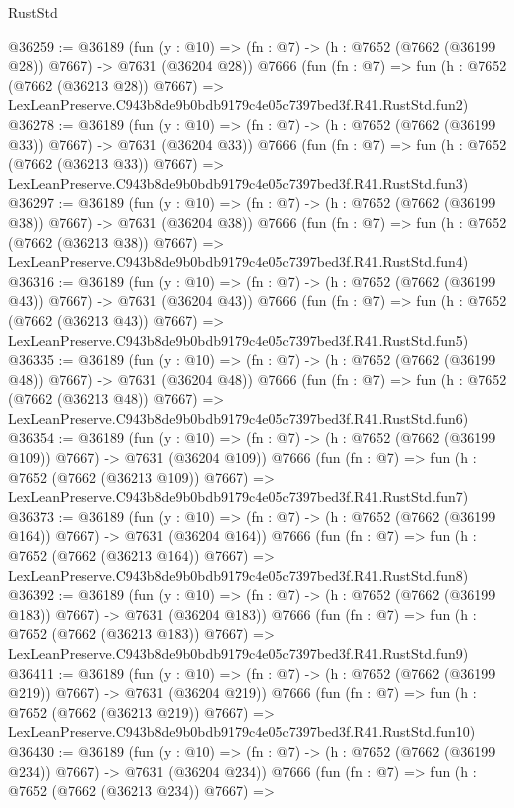 \begin{lexlean}{RustStd}
\begin{coremodule}
@36259 := @36189
    (fun (y : @10) => (fn : @7) -> (h : @7652 (@7662 (@36199 @28)) @7667) -> @7631 (@36204 @28))
    @7666
    (fun (fn : @7) =>
    fun (h : @7652 (@7662 (@36213 @28)) @7667) =>
    LexLeanPreserve.C943b8de9b0bdb9179c4e05c7397bed3f.R41.RustStd.fun2)
@36278 := @36189
    (fun (y : @10) => (fn : @7) -> (h : @7652 (@7662 (@36199 @33)) @7667) -> @7631 (@36204 @33))
    @7666
    (fun (fn : @7) =>
    fun (h : @7652 (@7662 (@36213 @33)) @7667) =>
    LexLeanPreserve.C943b8de9b0bdb9179c4e05c7397bed3f.R41.RustStd.fun3)
@36297 := @36189
    (fun (y : @10) => (fn : @7) -> (h : @7652 (@7662 (@36199 @38)) @7667) -> @7631 (@36204 @38))
    @7666
    (fun (fn : @7) =>
    fun (h : @7652 (@7662 (@36213 @38)) @7667) =>
    LexLeanPreserve.C943b8de9b0bdb9179c4e05c7397bed3f.R41.RustStd.fun4)
@36316 := @36189
    (fun (y : @10) => (fn : @7) -> (h : @7652 (@7662 (@36199 @43)) @7667) -> @7631 (@36204 @43))
    @7666
    (fun (fn : @7) =>
    fun (h : @7652 (@7662 (@36213 @43)) @7667) =>
    LexLeanPreserve.C943b8de9b0bdb9179c4e05c7397bed3f.R41.RustStd.fun5)
@36335 := @36189
    (fun (y : @10) => (fn : @7) -> (h : @7652 (@7662 (@36199 @48)) @7667) -> @7631 (@36204 @48))
    @7666
    (fun (fn : @7) =>
    fun (h : @7652 (@7662 (@36213 @48)) @7667) =>
    LexLeanPreserve.C943b8de9b0bdb9179c4e05c7397bed3f.R41.RustStd.fun6)
@36354 := @36189
    (fun (y : @10) => (fn : @7) -> (h : @7652 (@7662 (@36199 @109)) @7667) -> @7631 (@36204 @109))
    @7666
    (fun (fn : @7) =>
    fun (h : @7652 (@7662 (@36213 @109)) @7667) =>
    LexLeanPreserve.C943b8de9b0bdb9179c4e05c7397bed3f.R41.RustStd.fun7)
@36373 := @36189
    (fun (y : @10) => (fn : @7) -> (h : @7652 (@7662 (@36199 @164)) @7667) -> @7631 (@36204 @164))
    @7666
    (fun (fn : @7) =>
    fun (h : @7652 (@7662 (@36213 @164)) @7667) =>
    LexLeanPreserve.C943b8de9b0bdb9179c4e05c7397bed3f.R41.RustStd.fun8)
@36392 := @36189
    (fun (y : @10) => (fn : @7) -> (h : @7652 (@7662 (@36199 @183)) @7667) -> @7631 (@36204 @183))
    @7666
    (fun (fn : @7) =>
    fun (h : @7652 (@7662 (@36213 @183)) @7667) =>
    LexLeanPreserve.C943b8de9b0bdb9179c4e05c7397bed3f.R41.RustStd.fun9)
@36411 := @36189
    (fun (y : @10) => (fn : @7) -> (h : @7652 (@7662 (@36199 @219)) @7667) -> @7631 (@36204 @219))
    @7666
    (fun (fn : @7) =>
    fun (h : @7652 (@7662 (@36213 @219)) @7667) =>
    LexLeanPreserve.C943b8de9b0bdb9179c4e05c7397bed3f.R41.RustStd.fun10)
@36430 := @36189
    (fun (y : @10) => (fn : @7) -> (h : @7652 (@7662 (@36199 @234)) @7667) -> @7631 (@36204 @234))
    @7666
    (fun (fn : @7) =>
    fun (h : @7652 (@7662 (@36213 @234)) @7667) =>

\end{coremodule}
\end{lexlean}
